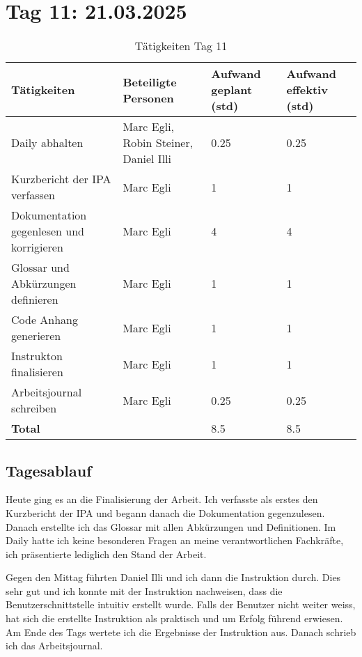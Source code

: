 \section{Tag 11: 21.03.2025}
\begin{table}[H]
    \begin{tabular}{|L{0.4\textwidth}|C{60pt}|C{60pt}|C{60pt}|}
        \hline
        \color{white}Tätigkeiten & \color{white}Beteiligte \color{white}Personen & \color{white}Aufwand geplant (std) & \color{white}Aufwand effektiv (std) \\
        \hline
        Daily abhalten & Marc Egli, Robin Steiner, Daniel Illi & 0.25 & 0.25 \\
        \hline
         Kurzbericht der IPA verfassen & Marc Egli & 1 & 1 \\
        \hline
        Dokumentation gegenlesen und korrigieren & Marc Egli & 4 & 4 \\
        \hline
        Glossar und Abkürzungen definieren & Marc Egli & 1 & 1 \\
        \hline
        Code Anhang generieren & Marc Egli & 1 & 1 \\
        \hline
        Instrukton finalisieren & Marc Egli & 1 & 1 \\
        \hline
        Arbeitsjournal schreiben & Marc Egli & 0.25 & 0.25 \\
        \hline
        \textbf{Total} &  & 8.5 & 8.5 \\
        \hline
    \end{tabular}
    \caption{Tätigkeiten Tag 11}
\end{table}

\subsection*{Tagesablauf}
Heute ging es an die Finalisierung der Arbeit. Ich verfasste als erstes den Kurzbericht der IPA und begann danach 
die Dokumentation gegenzulesen. Danach erstellte ich das Glossar mit allen Abkürzungen und Definitionen. Im Daily hatte ich keine 
besonderen Fragen an meine verantwortlichen Fachkräfte, ich präsentierte lediglich den Stand der Arbeit.

Gegen den Mittag führten Daniel Illi und ich dann die Instruktion durch. Dies sehr gut und ich konnte mit der Instruktion nachweisen, dass 
die Benutzerschnittstelle intuitiv erstellt wurde. Falls der Benutzer nicht weiter weiss, hat sich die erstellte Instruktion als praktisch und um Erfolg führend
erwiesen. Am Ende des Tags wertete ich die Ergebnisse der Instruktion aus. Danach schrieb ich das Arbeitsjournal.


